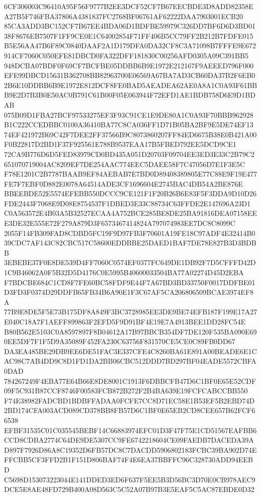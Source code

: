 \documentclass[UTF8,fontset=fandol,zihao=-4,a4paper]{ctexart}
\begin{document}
{{6CF306003C96410A95F56F9777B2EE3DCF52CF7B67EECBDE3D8ADD82358EA27B5F746FBA37806A4381837FC2768BF06761AF62222DAA7903001ECB20
85CA3ADD3BC152CF7B67EE4BDA06D1BDFBE59979C326DD7BF6D6D3BD0138F8676EB7507F1FF9CE0E1C64002854F71FF406B5CC79FF2B212B7FDFE015
B5E56AA47B6F89C0840DAAF2A1D179DFA0DA32CF8C3A71098B7FFFE9E672914CF7060C050EFE81DBCD0FA322DFF181830C00256AFD0305A09C391BB5
948DCBA07BDF0F69CF7BCFBE05DDBB6B9E1972E212167F9AEEED796F000EFE99DBCD15631B362708BB82963700E06569A67BA7AD3CB60DA37B2F6EB0
2B6E10DDBB6B9E1972E812DCF8FE0BAD5AEADEA62AE0A8A1C0A93F61BBB9E2D7B3B0E50AC0B791C61B00F05E063944F72EFD1AE1BDB758D6E9D1BDAB
075B09D1FBA27BCF97533275EF3F93C91CE1E9DE80A1C0A93F70BBB962928B1C222CCEDBBC0100A36410BA77C8CA036FF1D71B05BA2BF9E5DE74EF13
74EF421972B69C42F7DEE2FF37566B9C8073860207FF84ED6675B38E0B421A00F0B22817D2BD1F37F925561E788B9537EAA17B5FBED792EE5DCD9CE1
72CA9B776D6D5FED83979CD0BD435A051D20703F09704EE3ED3E33C2B79C2651070719004AC8209EF7DE254AAC774EEC5DAEE58F7C47056D7E1F3E5C
F78E1201C2B7787BAAB9EF84AEBAB7E7BD0D89408389805E77C88E9F19E477FE7F7EBF0D882E0078A64514ADE3CF1696604E2745BAC4DB54A2BE876E
BBEEBDE52E5574EFEBB550DCCC9CE121F1F20B26B6E83F5F3DDA9D10D26FDE2443F7068E9D08E8754537F1DBED3E33C88734C63FFDE2E147696A23D1
C0A563572E4B03A5B32527ECAA4A752BCE285BE8DE25BA91816DEA07158EEE3DE32E555E72F279A879D3F6573467414824A797074983EE7DC8C8099C
2055F14FB309FAD8CDBD5FC19F9D97FB3F70601A19FE18C97ADF4E32414B039CDC7AF143C82CBC517C58600EDDBBE25DAED1BAF7DE78E827B3D3BDBB
3EBEBE37F0E8DE539D4FF7060C0574EF0377FC649DE1DB92F7D5CFFFD42D1C9B46062A0F5B32D5D4176C0E5995B40600033504BA77A02274D45D2EBA
F7BDCBE684C1CD8F7FE60BC58FDF9E44F7A67BD3BD33750F0017DDFBE01D3FD3F0374D29DDFB65FB34B6A90E1F3C67AF5CA206806509BCAE3974EF8A
77B9E8DE5F5E73B175DF8A849F3BC3728985EE3DE9BE74EFB187F199E17A27E040C18A7F1AEFF899863F2EFD5F9D91BF4E19E7A4913BEE1DD28FC54E
B80B562E5103C0A8597897F8B04612A17B97BBCB354DF7DE120F535BA090E690EE5DF7F1F5D9A35089F452FA230C63756F831570CE5CE0C89FB0DD67
DA3EA485BE29DB9EE6DE51FAC3E337CFE4C8260BA61E891A00BEADE6E1CAC98C7AB4DD9C8D1FD1DA2BB06CBC512DDD7BD297BF04EADE5572CBFA0DAD
784267249F4EBA77E64B66E8DE8001C1913F6DBBCFB47D6C1BF0E65E52CDF09F5C931B87CCF8746F00583FCB872B272F2B4BA639E19FCFCABCCBB550
F74E38982FADCBD1BDBFFADAA0FCFE7CC8D71EC58E1B53EF5B2EBD74D2BD174CFA003ACD089CD378BB8FB57D6C1BF0E65EB2CD8CEE657B62FCF66538
EFBF31535C01C035545BEBF14C66883974EFC01D3F47F75E1CD51567EAFBB6CCD8CDBA2774C64DE9DE5307CC9FE6742218604CE09FAEDB7DACEDA39A
D897F7926D86A8C19352D6FB57DC8C7DACDD5906802183FCBC39BA902D74EFFCBB5CF3FFD2B1F151D806BAF74F4E6EA37BBFFC96C328730ADD94EEBD
C5698D153073223044E141DDED3ED6F637F5EE5B3D56BC3D70E0CB978AEC9DCE5E8AE48FD729B400A08D563C5C52A07B97B3E5EAF5C5AC87EBDE0D32
}}
\end{document}
